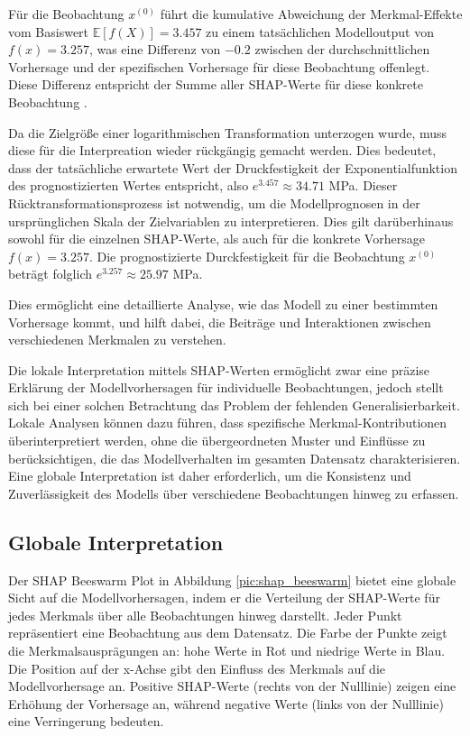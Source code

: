 Für die Beobachtung $x^{(0)}$ führt die kumulative Abweichung der Merkmal-Effekte 
vom Basiswert $\mathbb{E}[f(X)] = 3.457$ zu einem tatsächlichen Modelloutput von $f(x) = 3.257$, 
was eine Differenz von $-0.2$ zwischen der durchschnittlichen Vorhersage 
und der spezifischen Vorhersage für diese Beobachtung offenlegt. 
Diese Differenz entspricht der Summe aller SHAP-Werte für diese konkrete Beobachtung \cite[S. 52f]{Molnar_2023}.

Da die Zielgröße einer logarithmischen Transformation unterzogen wurde, muss diese für die Interpreation wieder rückgängig gemacht werden. 
Dies bedeutet, dass der tatsächliche erwartete Wert der Druckfestigkeit der Exponentialfunktion des prognostizierten Wertes entspricht, also $e^{3.457} \approx 34.71$ MPa. 
Dieser Rücktransformationsprozess ist notwendig, um die Modellprognosen in der ursprünglichen Skala der Zielvariablen zu interpretieren.
Dies gilt darüberhinaus sowohl für die einzelnen SHAP-Werte, als auch für die konkrete Vorhersage $f(x) = 3.257$. 
Die prognostizierte Durckfestigkeit für die Beobachtung $x^{(0)}$ beträgt folglich $e^{3.257} \approx 25.97$ MPa.

Dies ermöglicht eine detaillierte Analyse, wie das Modell zu einer bestimmten Vorhersage kommt, 
und hilft dabei, die Beiträge und Interaktionen zwischen verschiedenen Merkmalen zu verstehen.

Die lokale Interpretation mittels SHAP-Werten ermöglicht zwar eine präzise Erklärung 
der Modellvorhersagen für individuelle Beobachtungen, jedoch stellt sich bei einer 
solchen Betrachtung das Problem der fehlenden Generalisierbarkeit. 
Lokale Analysen können dazu führen, dass spezifische Merkmal-Kontributionen überinterpretiert werden, 
ohne die übergeordneten Muster und Einflüsse zu berücksichtigen, 
die das Modellverhalten im gesamten Datensatz charakterisieren. 
Eine globale Interpretation ist daher erforderlich, um die Konsistenz und Zuverlässigkeit 
des Modells über verschiedene Beobachtungen hinweg zu erfassen. 

\subsection{Globale Interpretation}

Der SHAP Beeswarm Plot in Abbildung \ref{pic:shap_beeswarm} bietet eine globale 
Sicht auf die Modellvorhersagen, indem er die Verteilung der SHAP-Werte für jedes Merkmals 
über alle Beobachtungen hinweg darstellt. Jeder Punkt repräsentiert eine Beobachtung aus dem Datensatz.
Die Farbe der Punkte zeigt die Merkmalsausprägungen an: hohe Werte in Rot und niedrige Werte in Blau. 
Die Position auf der x-Achse gibt den Einfluss des Merkmals auf die Modellvorhersage an. 
Positive SHAP-Werte (rechts von der Nulllinie) zeigen eine Erhöhung der Vorhersage an, 
während negative Werte (links von der Nulllinie) eine Verringerung bedeuten. 

